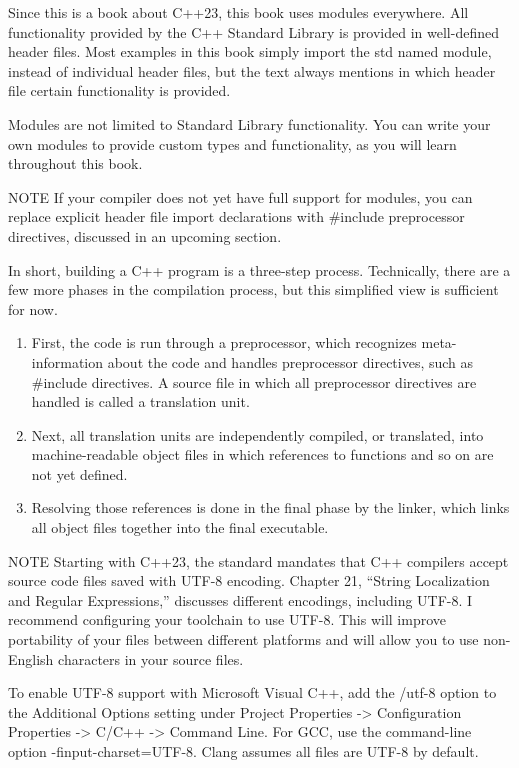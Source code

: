 Since this is a book about C++23, this book uses modules everywhere. All functionality provided by the C++ Standard Library is provided in well-defined header files. Most examples in this book simply import the std named module, instead of individual header files, but the text always mentions in which header file certain functionality is provided.

Modules are not limited to Standard Library functionality. You can write your own modules to provide custom types and functionality, as you will learn throughout this book.

\begin{myNotic}{NOTE}
If your compiler does not yet have full support for modules, you can replace explicit header file import declarations with \#include preprocessor directives, discussed in an upcoming section.
\end{myNotic}


In short, building a C++ program is a three-step process. Technically, there are a few more phases in the compilation process, but this simplified view is sufficient for now.

\begin{enumerate}
\item
First, the code is run through a preprocessor, which recognizes meta-information about the code and handles preprocessor directives, such as \#include directives. A source file in which all preprocessor directives are handled is called a translation unit.

\item
Next, all translation units are independently compiled, or translated, into machine-readable object files in which references to functions and so on are not yet defined.

\item
Resolving those references is done in the final phase by the linker, which links all object files together into the final executable.
\end{enumerate}


\begin{myNotic}{NOTE}
Starting with C++23, the standard mandates that C++ compilers accept source code files saved with UTF-8 encoding. Chapter 21, “String Localization and Regular Expressions,” discusses different encodings, including UTF-8. I recommend configuring your toolchain to use UTF-8. This will improve portability of your files between different platforms and will allow you to use non-English characters in your source files.

To enable UTF-8 support with Microsoft Visual C++, add the /utf-8 option to the Additional Options setting under Project Properties -> Configuration Properties -> C/C++ -> Command Line. For GCC, use the command-line option -finput-charset=UTF-8. Clang assumes all files are UTF-8 by default.
\end{myNotic}

